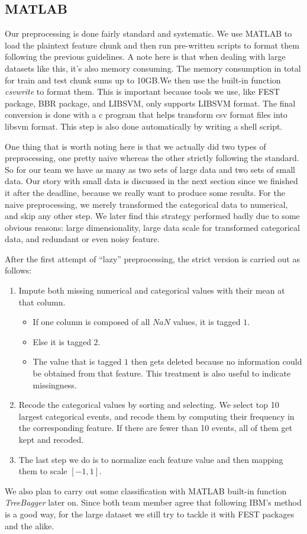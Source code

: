 \documentclass[journal]{IEEEtran}
\begin{document}
\subsection{MATLAB}
\label{sec:matlab}

Our preprocessing is done fairly standard and systematic. We use
MATLAB to load the plaintext feature chunk and then run pre-written
scripts to format them following the previous guidelines. A note here
is that when dealing with large datasets like this, it's also memory
consuming. The memory consumption in total for train and test chunk
sums up to 10GB.\@ We then use the built-in function \emph{csvwrite}
to format them. This is important because tools we use, like FEST
package, BBR package, and LIBSVM, only supports LIBSVM format. The
final conversion is done with a c program that helps transform csv
format files into libsvm format. This step is also done automatically
by writing a shell script.
\par
One thing that is worth noting here is that we actually did two types
of preprocessing, one pretty naive whereas the other strictly
following the standard. So for our team we have as many as two sets of
large data and two sets of small data. Our story with small data is
discussed in the next section since we finished it after the deadline,
because we really want to produce some results. For the naive
preprocessing, we merely transformed the categorical data to
numerical, and skip any other step. We later find this strategy
performed badly due to some obvious reasons: large dimensionality,
large data scale for transformed categorical data, and redundant or
even noisy feature. 
\par
After the first attempt of ``lazy'' preprocessing, the strict version
is carried out as follows:
\begin{enumerate}
\item Impute both missing numerical and categorical values with their
  mean at that column.
  \begin{itemize}
  \item If one column is composed of all $NaN$ values, it is tagged
    $1$.
  \item Else it is tagged $2$. 
  \item The value that is tagged $1$ then gets deleted because no
    information could be obtained from that feature. This treatment is
    also useful to indicate missingness. 
  \end{itemize}
\item Recode the categorical values by sorting and selecting. We
  select top 10 largest categorical events, and recode them by
  computing their frequency in the corresponding feature. If there are
  fewer than 10 events, all of them get kept and recoded. 
\item The last step we do is to normalize each feature value and then
  mapping them to scale $[-1, 1]$. 
\end{enumerate}
We also plan to carry out some classification with MATLAB built-in
function \emph{TreeBagger} later on. Since both team member agree that
following IBM's method is a good way, for the large dataset we still
try to tackle it with FEST packages and the alike.
\end{document}
